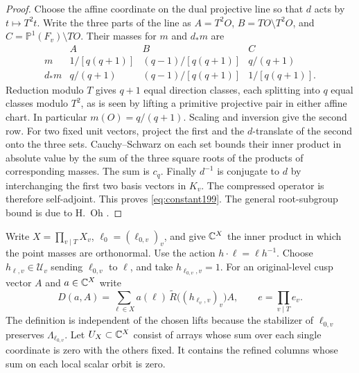 \documentclass[a4paper,11pt]{article}
\theoremstyle{definition}
\theoremstyle{remark}
\numberwithin{equation}{section}
\begin{document}
\begin{proof}
Choose the affine coordinate on the dual projective line so that
\(d\) acts by \(t\mapsto T^2t\). Write the three parts of the line as
\(A=T^2O\), \(B=TO\setminus T^2O\), and \(C=\mathbb P^1(F_v)
\setminus TO\). Their masses for \(m\) and \(d_*m\) are
\[
 \begin{array}{c|ccc}
       & A&B&C\\ \hline
 m     &1/[q(q+1)]&(q-1)/[q(q+1)]&q/(q+1)\\
 d_*m  &q/(q+1)&(q-1)/[q(q+1)]&1/[q(q+1)] .
 \end{array}
\]
Reduction modulo \(T\) gives \(q+1\) equal direction classes,
each splitting into \(q\) equal classes modulo \(T^2\), as is
seen by lifting a primitive projective pair in either affine
chart. In particular \(m(O)=q/(q+1)\). Scaling and inversion
give the second row. For two fixed unit vectors, project the
first and the \(d\)-translate of the second onto the three sets.
Cauchy--Schwarz on each set bounds their inner product in
absolute value by the sum of the three square roots of the
products of corresponding masses. The sum is \(c_q\).
Finally \(d^{-1}\) is conjugate to \(d\) by interchanging the
first two basis vectors in \(K_v\). The compressed operator
is therefore self-adjoint. This proves \eqref{eq:constant199}.
The general root-subgroup bound is due to H.~Oh \cite{XVI-XIII-IV-oh199}.
\end{proof}

Write \(X=\prod_{v\mid T}X_v\), \(\ell_0=(\ell_{0,v})_v\),
and give \(\mathbb C^X\) the inner product in which the point masses
are orthonormal. Use the action \(h\cdot\ell=\ell h^{-1}\).
Choose \(h_{\ell,v}\in\mathcal U_v\) sending \(\ell_{0,v}\)
to \(\ell\), and take \(h_{\ell_{0,v},v}=1\).
For an original-level cusp vector \(A\) and \(a\in\mathbb C^X\) write
\[
       D(a,A)=\sum_{\ell\in X} a(\ell)\,
                  \widetilde R\big((h_{\ell_v,v})_v\big)A,
       \qquad e=\prod_{v\mid T}e_v .
\]
The definition is independent of the chosen lifts because the
stabilizer of \(\ell_{0,v}\) preserves \(\Lambda_{\ell_{0,v}}\).
Let \(U_X\subset\mathbb C^X\) consist of arrays whose sum over each
single coordinate is zero with the others fixed. It contains
the refined columns whose sum on each local scalar orbit is zero.
\end{document}
